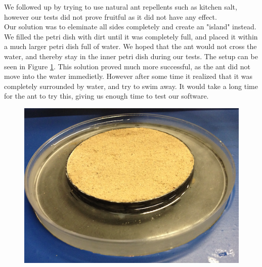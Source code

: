 We followed up by trying to use natural ant repellents such as kitchen salt, however our tests did not prove fruitful as it did not have any effect.\\

Our solution was to eleminate all sides completely and create an "island" instead. We filled the petri dish with dirt until it was completely full, and placed it within a much larger petri dish full of water. We hoped that the ant would not cross the water, and thereby stay in the inner petri dish during our tests. The setup can be seen in Figure \ref{fig:petridish}. This solution proved much more successful, as the ant did not move into the water immedietly. However after some time it realized that it was completely surrounded by water, and try to swim away. It would take a long time for the ant to try this, giving us enough time to test our software.\\

\begin{figure}[ht!]
  \centering
    \includegraphics[scale=0.25]{img/petridish}
  \caption{}
  \label{fig:petridish}
\end{figure}